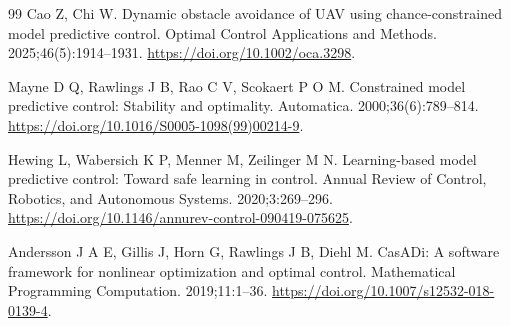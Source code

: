 \documentclass[10pt,a4paper]{article}
\begin{document}
\begin{thebibliography}{99}
 Cao Z, Chi W. Dynamic obstacle avoidance of UAV using chance-constrained model predictive control. Optimal Control Applications and Methods. 2025;46(5):1914–1931. \url{https://doi.org/10.1002/oca.3298}.

 Mayne D Q, Rawlings J B, Rao C V, Scokaert P O M. Constrained model predictive control: Stability and optimality. Automatica. 2000;36(6):789–814. \url{https://doi.org/10.1016/S0005-1098(99)00214-9}.

 Hewing L, Wabersich K P, Menner M, Zeilinger M N. Learning-based model predictive control: Toward safe learning in control. Annual Review of Control, Robotics, and Autonomous Systems. 2020;3:269–296. \url{https://doi.org/10.1146/annurev-control-090419-075625}.

 Andersson J A E, Gillis J, Horn G, Rawlings J B, Diehl M. CasADi: A software framework for nonlinear optimization and optimal control. Mathematical Programming Computation. 2019;11:1–36. \url{https://doi.org/10.1007/s12532-018-0139-4}.

\end{thebibliography}
\end{document}
